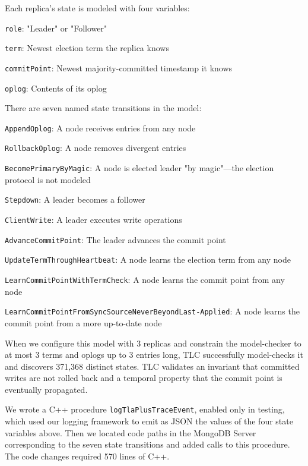 \documentclass{vldb}
\begin{document}
Each replica's state is modeled with four variables:

\begin{description}
\item \texttt{role}: "Leader" or "Follower"
\item \texttt{term}: Newest election term the replica knows
\item \texttt{commitPoint}: Newest majority-committed timestamp it knows
\item \texttt{oplog}: Contents of its oplog
\end{description}

There are seven named state transitions in the model:

\begin{description}
\item \texttt{AppendOplog}: A node receives entries from any node
\item \texttt{RollbackOplog}: A node removes divergent entries
\item \texttt{BecomePrimaryByMagic}: A node is elected leader "by magic"---the election protocol is not modeled
\item \texttt{Stepdown}: A leader becomes a follower
\item \texttt{ClientWrite}: A leader executes write operations
\item \texttt{AdvanceCommitPoint}: The leader advances the commit point
\item \texttt{UpdateTermThroughHeartbeat}: A node learns the election term from any node
\item \texttt{LearnCommitPointWithTermCheck}: A node learns the commit point from any node
\item \texttt{LearnCommitPointFromSyncSourceNeverBeyondLast-\linebreak{}Applied}: A node learns the commit point from a more up-to-date node
\end{description}

When we configure this model with 3 replicas and constrain the model-checker to at most 3 terms and oplogs up to 3 entries long, TLC successfully model-checks it and discovers 371,368 distinct states.
TLC validates an invariant that committed writes are not rolled back and a temporal property that the commit point is eventually propagated.

We wrote a C++ procedure \texttt{logTlaPlusTraceEvent}, enabled only in testing, which used our logging framework to emit as JSON the values of the four state variables above.
Then we located code paths in the MongoDB Server corresponding to the seven state transitions and added calls to this procedure.
The code changes required 570 lines of C++.
\end{document}
